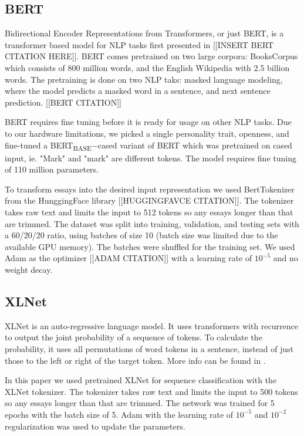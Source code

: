 \documentclass[10pt, a4paper]{article}
\begin{document}
\subsection{BERT}

Bidirectional Encoder Representations from Transformers, or just BERT, is a transformer based model for NLP tasks first presented in [[INSERT BERT CITATION HERE]]. 
BERT comes pretrained on two large corpora: BooksCorpus which consists of 800 million words, and the English Wikipedia with 2.5 billion words. 
The pretraining is done on two NLP taks: masked language modeling, where the model predicts a masked word in a sentence, and next sentence prediction. [[BERT CITATION]]

BERT requires fine tuning before it is ready for usage on other NLP tasks. 
Due to our hardware limitations, we picked a single personality trait, openness, and fine-tuned a BERT\textsubscript{BASE}$-$cased variant of BERT which was pretrained on cased input, ie. "Mark" and "mark" are different tokens. 
The model requires fine tuning of 110 million parameters.

To transform essays into the desired input representation we used BertTokenizer from the HunggingFace library [[HUGGINGFAVCE CITATION]]. 
The tokenizer takes raw text and limits the input to 512 tokens so any essays longer than that are trimmed. 
The dataset was split into training, validation, and testing sets with a 60/20/20 ratio, using batches of size 10 (batch size was limited due to the available GPU memory). 
The batches were shuffled for the training set. We used Adam as the optimizer [[ADAM CITATION]] with a learning rate of $10^{-5}$ and no weight decay.

\subsection{XLNet}

XLNet is an auto-regressive language model.
It uses transformers with recurrence to output the joint probability of a sequence of tokens.
To calculate the probability, it uses all permutations of word tokens in a sentence, instead of just those to the left or right of the target token.
More info can be found in \citep{DBLP:journals/corr/abs-1906-08237}.

In this paper we used pretrained XLNet for sequence classification with the XLNet tokenizer.
The tokenizer takes raw text and limits the input to 500 tokens so any essays longer than that are trimmed.
The network was trained for 5 epochs with the batch size of 5.
Adam with the learning rate of $10^{-5}$ and $10^{-2}$ regularization was used to update the parameters.
\end{document}
